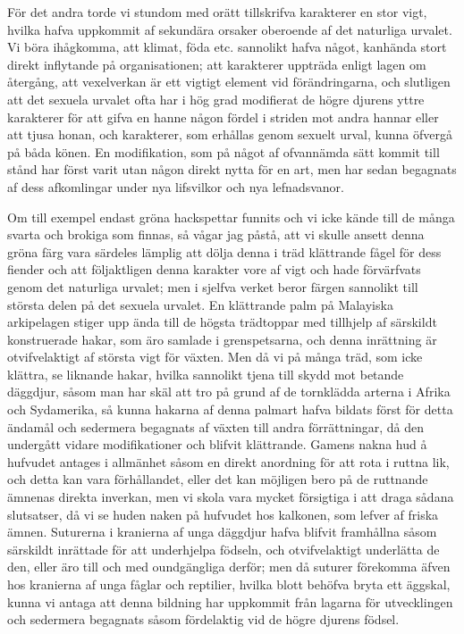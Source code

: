 För det andra torde vi stundom med orätt tillskrifva karakterer en stor vigt, hvilka hafva uppkommit af sekundära orsaker oberoende af det naturliga urvalet. Vi böra ihågkomma, att klimat, föda etc. sannolikt hafva något, kanhända stort direkt inflytande på organisationen; att karakterer uppträda enligt lagen om återgång, att vexelverkan är ett vigtigt element vid förändringarna, och slutligen att det sexuela urvalet ofta har i hög grad modifierat de högre djurens yttre karakterer för att gifva en hanne någon fördel i striden mot andra hannar eller att tjusa honan, och karakterer, som erhållas genom sexuelt urval, kunna öfvergå på båda könen. En modifikation, som på något af ofvannämda sätt kommit till stånd har först varit utan någon direkt nytta för en art, men har sedan begagnats af dess afkomlingar under nya lifsvilkor och nya lefnadsvanor.

Om till exempel endast gröna hackspettar funnits och vi icke kände till de många svarta och brokiga som finnas, så vågar jag påstå, att vi skulle ansett denna gröna färg vara särdeles lämplig att dölja denna i träd klättrande fågel för dess fiender och att följaktligen denna karakter vore af vigt och hade förvärfvats genom det naturliga urvalet; men i sjelfva verket beror färgen sannolikt till största delen på det sexuela urvalet. En klättrande palm på Malayiska arkipelagen stiger upp ända till de högsta trädtoppar med tillhjelp af särskildt konstruerade hakar, som äro samlade i grenspetsarna, och denna inrättning är otvifvelaktigt af största vigt för växten. Men då vi på många träd, som icke klättra, se liknande hakar, hvilka sannolikt tjena till skydd mot betande däggdjur, såsom man har skäl att tro på grund af de tornklädda arterna i Afrika och Sydamerika, så kunna hakarna af denna palmart hafva bildats först för detta ändamål och sedermera begagnats af växten till andra förrättningar, då den undergått vidare modifikationer och blifvit klättrande. Gamens nakna hud å hufvudet antages i allmänhet såsom en direkt anordning för att rota i ruttna lik, och detta kan vara förhållandet, eller det kan möjligen bero på de ruttnande ämnenas direkta inverkan, men vi skola vara mycket försigtiga i att draga sådana slutsatser, då vi se huden naken på hufvudet hos kalkonen, som lefver af friska ämnen. Suturerna i kranierna af unga däggdjur hafva blifvit framhållna såsom särskildt inrättade för att underhjelpa födseln, och otvifvelaktigt underlätta de den, eller äro till och med oundgängliga derför; men då suturer förekomma äfven hos kranierna af unga fåglar och reptilier, hvilka blott behöfva bryta ett äggskal, kunna vi antaga att denna bildning har uppkommit från lagarna för utvecklingen och sedermera begagnats såsom fördelaktig vid de högre djurens födsel.

